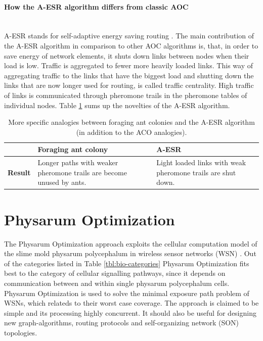 \documentclass[cameraready]{IWORK2014}
\begin{document}
\paragraph{How the A-ESR algorithm differs from classic AOC}~\\
A-ESR stands for self-adaptive energy saving routing \cite{kim2012ant}. The main contribution of the A-ESR algorithm in comparison to other AOC algorithms is, that, in order to save energy of network elements, it shuts down links between nodes when their load is low. Traffic is aggregated to fewer more heavily loaded links. This way of aggregating traffic to the links that have the biggest load and shutting down the links that are now longer used for routing, is called traffic centrality. High traffic of links is communicated through pheromone trails in the pheromone tables of individual nodes. Table \ref{tbl:analogies_a-esr} sums up the novelties of the A-ESR algorithm.

\begin{table}
    \centering
	\begin{tabularx}{0.90\textwidth}{|X|X|X|}
		\hline & \textbf{Foraging ant colony} & \textbf{A-ESR} \\ \hline	
		\textbf{Result} & Longer paths with weaker pheromone trails are become unused by ants. & Light loaded links with weak pheromone trails are shut down. \\ \hline
	\end{tabularx}
	\caption{More specific analogies between foraging ant colonies and the A-ESR algorithm (in addition to the ACO analogies).}
	\label{tbl:analogies_a-esr}
\end{table}

\section{Physarum Optimization}
The Physarum Optimization approach exploits the cellular computation model of the slime mold physarum polycephalum in wireless sensor networks (WSN) \cite{liu2012physarum}. Out of the categories listed in Table \ref{tbl:bio-categories} Physarum Optimization fits best to the category of cellular signalling pathways, since it depends on communication between and within single physarum polycephalum cells. Physarum Optimization is used to solve the minimal exposure path problem of WSNs, which relateds to their worst case coverage. The approach is claimed to be simple and its processing highly concurrent. It should also be useful for designing new graph-algorithms, routing protocols and self-organizing network (SON) topologies.
\end{document}
